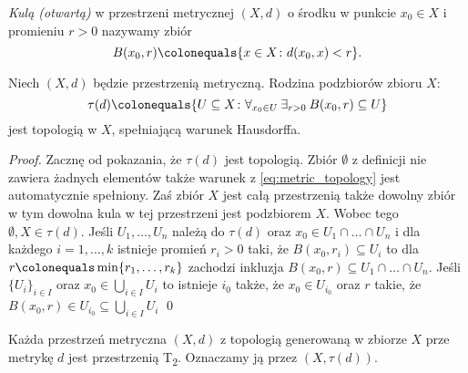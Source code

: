 {\begin{definition}[Kula]
        \emph{Kulą (otwartą)} w przestrzeni metrycznej $(X, d)$ o środku w punkcie $x_0\in X$ i promieniu $r > 0$ nazywamy zbiór
        \begin{equation}
            B(x_0, r) \colonequals \{x\in X\colon d(x_0, x) < r\}.
        \end{equation}
    \end{definition}
    \begin{theorem}
        Niech $(X, d)$ będzie przestrzenią metryczną. Rodzina podzbiorów zbioru $X$:
        \begin{equation}
            \label{eq:metric_topology}
            \tau(d) \colonequals \{U\subseteq X\colon\nforall{x_0\in U}\nexists{r>0} B(x_0, r)\subseteq U\}
        \end{equation}
        jest topologią w $X$, spełniającą warunek Hausdorffa.
    \end{theorem}
    \begin{proof}
        Zacznę od pokazania, że $\tau(d)$ jest topologią. Zbiór $\emptyset$ z definicji nie zawiera żadnych elementów także warunek z \ref{eq:metric_topology} jest automatycznie spełniony. Zaś zbiór $X$ jest całą przestrzenią także dowolny zbiór w tym dowolna kula w tej przestrzeni jest podzbiorem $X$. Wobec tego $\emptyset, X \in \tau(d)$. Jeśli $U_1,\ldots,U_n$ należą do $\tau(d)$ oraz $x_0\in U_1\cap\ldots\cap U_n$ i dla każdego $i = 1, \ldots, k$ istnieje promień $r_i > 0$ taki, że $B(x_0, r_i) \subseteq U_i$ to dla $r\colonequals\min\{r_1,\ldots,r_k\}$ zachodzi inkluzja $B(x_0, r)\subseteq U_1\cap\ldots\cap U_n$. Jeśli $\{U_i\}_{i\in I}$ oraz $x_0\in\bigcup_{i\in I}U_i$ to istnieje $i_0$ także, że $x_0\in U_{i_0}$ oraz $r$ takie, że $B(x_0, r)\in U_{i_0}\subseteq \bigcup_{i\in I}U_i $ \qed
    \end{proof}
    \begin{thmcoro}
        Każda przestrzeń metryczna $(X, d)$ z topologią generowaną w zbiorze $X$ prze metrykę $d$ jest przestrzenią T\textsubscript{2}. Oznaczamy ją przez $(X, \tau(d))$.
    \end{thmcoro}
}